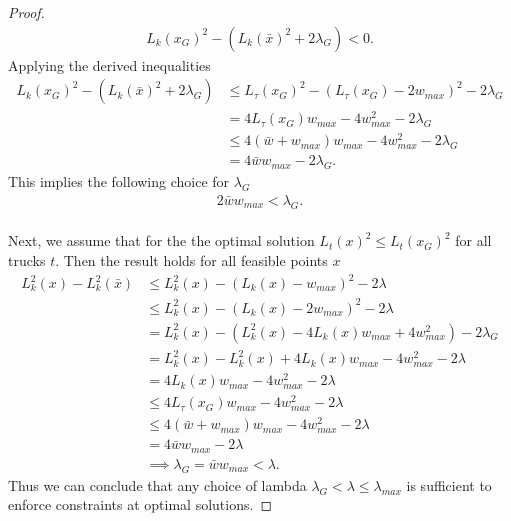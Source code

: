 \documentclass[12pt]{article}
\begin{document}
\begin{proof}
\begin{gather*}
L_k(x_G)^2 - (L_k(\bar{x})^2 + 2\lambda_G) < 0.
\end{gather*}
Applying the derived inequalities
\begin{align*}
L_k(x_G)^2 - (L_k(\bar{x})^2 + 2\lambda_G) &\leq L_{\tau}(x_G)^2 - (L_{\tau}(x_G) - 2w_{max})^2 - 2\lambda_G \\
&= 4L_{\tau}(x_G)w_{max} - 4w_{max}^2 - 2 \lambda_G \\
&\leq 4(\bar{w} + w_{max}) w_{max}  - 4w_{max}^2 -2 \lambda_G \\
&= 4\bar{w}w_{max}  -2 \lambda_G.
\end{align*}
This implies the following choice for $\lambda_G$
\begin{gather*}
2\bar{w}w_{max} < \lambda_G.
\end{gather*}
\\
Next, we assume that for the the optimal solution  $L_t(x)^2 \leq L_t(x_G)^2$ for all trucks $t$. 
Then the result holds for all feasible points $x$
\begin{align*}
L^2_k(x) - L^2_k(\bar{x}) &\leq L^2_k(x) - \left( L_k(x) - w_{max} \right ) ^2 - 2\lambda \\
&\leq L^2_k(x) - \left( L_k(x) - 2w_{max} \right ) ^2 - 2\lambda \\
&= L^2_k(x) - \left( L^2_k(x) - 4 L_k(x) w_{max} + 4w_{max}^2 \right ) - 2\lambda_{G} \\
&= L^2_k(x) - L^2_k(x) + 4 L_k(x) w_{max} - 4w_{max}^2  - 2\lambda \\
&=  4 L_k(x) w_{max} - 4w_{max}^2  - 2\lambda \\
&\leq  4 L_{\tau}(x_G) w_{max} - 4w_{max}^2  - 2\lambda  \\
&\leq 4(\bar{w} + w_{max}) w_{max}  - 4w_{max}^2 -2 \lambda \\
&= 4\bar{w}w_{max}  -2 \lambda \\
&\implies \lambda_{G} = \bar{w} w_{max} < \lambda. 
\end{align*}
Thus we can conclude that any choice of lambda $\lambda_G < \lambda \leq \lambda_{max}$ is sufficient to enforce constraints at optimal solutions.
\end{proof}
\end{document}
